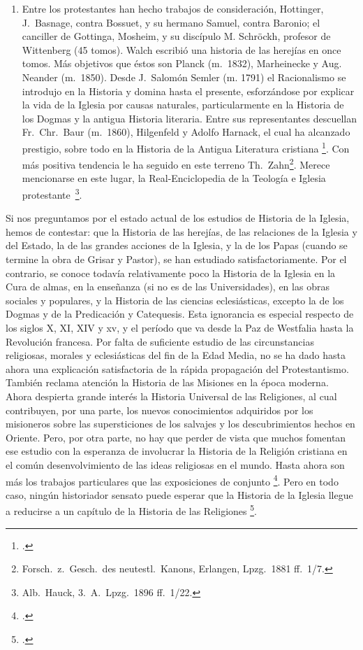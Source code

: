 \raggedbottom{} \documentclass[12pt, a4paper]{book}
\begin{document}
\begin{enumerate}
  \item Entre los protestantes han hecho trabajos de consideración, Hottinger, J.\ Basnage, contra Bossuet, y su hermano Samuel, contra Baronio; el canciller de Gottinga, Mosheim, y su discípulo M. Schröckh, profesor de Wittenberg (45 tomos). Walch escribió una historia de las herejías en once tomos. Más objetivos que éstos son Planck (m.\ 1832), Marheinecke y Aug. Neander (m.\ 1850). Desde J.\ Salomón Semler (m. 1791) el Racionalismo se introdujo en la Historia y domina hasta el presente, esforzándose por explicar la vida de la Iglesia por causas naturales, particularmente en la Historia de los Dogmas y la antigua Historia literaria. Entre sus representantes descuellan Fr.\ Chr.\ Baur (m.\ 1860), Hilgenfeld y Adolfo Harnack, el cual ha alcanzado prestigio, sobre todo en la Historia de la Antigua Literatura cristiana \footcite{HilgenfeldHarnack1884Dogmengeschichte}. Con más positiva tendencia le ha seguido en este terreno Th.\ Zahn\footnote{Forsch.\ z.\ Gesch.\ des neutestl.\ Kanons, Erlangen, Lpzg.\ 1881 ff.\ 1/7.}. Merece mencionarse en este lugar, la Real-Enciclopedia de la Teología e Iglesia protestante\ \footnote{Alb.\ Hauck, 3.\ A.\ Lpzg.\ 1896 ff.\ 1/22.}.
\end{enumerate}

Si nos preguntamos por el estado actual de los estudios de Historia de la Iglesia, hemos de contestar: que la Historia de las herejías, de las relaciones de la Iglesia y del Estado, la de las grandes acciones de la Iglesia, y la de los Papas (cuando se termine la obra de Grisar y Pastor), se han estudiado satisfactoriamente. Por el contrario, se conoce todavía relativamente poco la Historia de la Iglesia en la Cura de almas, en la enseñanza (si no es de las Universidades), en las obras sociales y populares, y la Historia de las ciencias eclesiásticas, excepto la de los Dogmas y de la Predicación y Catequesis. Esta ignorancia es especial respecto de los siglos X, XI, XIV y xv, y el período que va desde la Paz de Westfalia hasta la Revolución francesa. Por falta de suficiente estudio de las circunstancias religiosas, morales y eclesiásticas del fin de la Edad Media, no se ha dado hasta ahora una explicación satisfactoria de la rápida propagación del Protestantismo. También reclama atención la Historia de las Misiones en la época moderna. Ahora despierta grande interés la Historia Universal de las Religiones, al cual contribuyen, por una parte, los nuevos conocimientos adquiridos por los misioneros sobre las supersticiones de los salvajes y los descubrimientos hechos en Oriente. Pero, por otra parte, no hay que perder de vista que muchos fomentan ese estudio con la esperanza de involucrar la Historia de la Religión cristiana en el común desenvolvimiento de las ideas religiosas en el mundo. Hasta ahora son más los trabajos particulares que las exposiciones de conjunto \footcite{Saussaye1898Religionsgeschichte}. Pero en todo caso, ningún historiador sensato puede esperar que la Historia de la Iglesia llegue a reducirse a un capítulo de la Historia de las Religiones \footcite{Shrors1905Nicht}.
\end{document}
